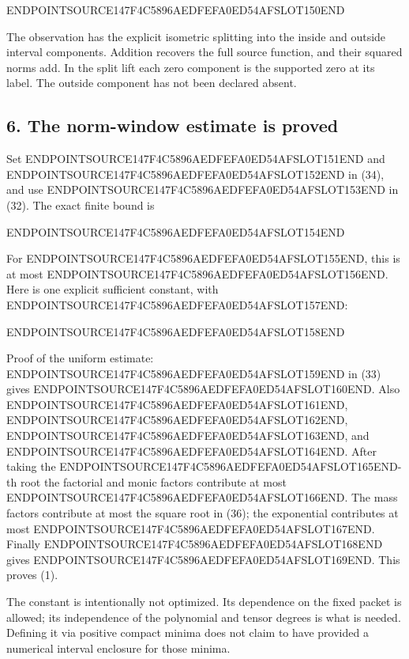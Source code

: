 ENDPOINTSOURCE147F4C5896AEDFEFA0ED54AFSLOT150END

The observation has the explicit isometric splitting into the inside and outside interval components. Addition recovers the full source function, and their squared norms add. In the split lift each zero component is the supported zero at its label. The outside component has not been declared absent.

\subsection{6. The norm-window estimate is proved}\label{endpoint-arithmetic_original--the-norm-window-estimate-is-proved}

Set ENDPOINTSOURCE147F4C5896AEDFEFA0ED54AFSLOT151END and ENDPOINTSOURCE147F4C5896AEDFEFA0ED54AFSLOT152END in (34), and use ENDPOINTSOURCE147F4C5896AEDFEFA0ED54AFSLOT153END in (32). The exact finite bound is

ENDPOINTSOURCE147F4C5896AEDFEFA0ED54AFSLOT154END

For ENDPOINTSOURCE147F4C5896AEDFEFA0ED54AFSLOT155END, this is at most ENDPOINTSOURCE147F4C5896AEDFEFA0ED54AFSLOT156END. Here is one explicit sufficient constant, with ENDPOINTSOURCE147F4C5896AEDFEFA0ED54AFSLOT157END:

ENDPOINTSOURCE147F4C5896AEDFEFA0ED54AFSLOT158END

Proof of the uniform estimate: ENDPOINTSOURCE147F4C5896AEDFEFA0ED54AFSLOT159END in (33) gives ENDPOINTSOURCE147F4C5896AEDFEFA0ED54AFSLOT160END. Also ENDPOINTSOURCE147F4C5896AEDFEFA0ED54AFSLOT161END, ENDPOINTSOURCE147F4C5896AEDFEFA0ED54AFSLOT162END, ENDPOINTSOURCE147F4C5896AEDFEFA0ED54AFSLOT163END, and ENDPOINTSOURCE147F4C5896AEDFEFA0ED54AFSLOT164END. After taking the ENDPOINTSOURCE147F4C5896AEDFEFA0ED54AFSLOT165END-th root the factorial and monic factors contribute at most ENDPOINTSOURCE147F4C5896AEDFEFA0ED54AFSLOT166END. The mass factors contribute at most the square root in (36); the exponential contributes at most ENDPOINTSOURCE147F4C5896AEDFEFA0ED54AFSLOT167END. Finally ENDPOINTSOURCE147F4C5896AEDFEFA0ED54AFSLOT168END gives ENDPOINTSOURCE147F4C5896AEDFEFA0ED54AFSLOT169END. This proves (1).

The constant is intentionally not optimized. Its dependence on the fixed packet is allowed; its independence of the polynomial and tensor degrees is what is needed. Defining it via positive compact minima does not claim to have provided a numerical interval enclosure for those minima.

